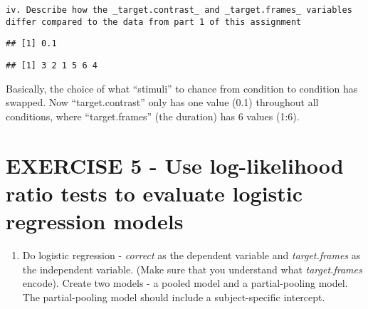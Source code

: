 \documentclass[
]{article}
\newenvironment{Shaded}{\begin{snugshade}}{\end{snugshade}}
\newcommand{\FunctionTok}[1]{\textcolor[rgb]{0.00,0.00,0.00}{#1}}
\newcommand{\NormalTok}[1]{#1}
\newcommand{\SpecialCharTok}[1]{\textcolor[rgb]{0.00,0.00,0.00}{#1}}
\providecommand{\tightlist}{%
  \setlength{\itemsep}{0pt}\setlength{\parskip}{0pt}}
\begin{document}
\begin{verbatim}
iv. Describe how the _target.contrast_ and _target.frames_ variables differ compared to the data from part 1 of this assignment
\end{verbatim}

\begin{Shaded}
\end{Shaded}

\begin{verbatim}
## [1] 0.1
\end{verbatim}

\begin{Shaded}
\end{Shaded}

\begin{verbatim}
## [1] 3 2 1 5 6 4
\end{verbatim}

Basically, the choice of what ``stimuli'' to chance from condition to
condition has swapped. Now ``target.contrast'' only has one value (0.1)
throughout all conditions, where ``target.frames'' (the duration) has 6
values (1:6).

\hypertarget{exercise-5---use-log-likelihood-ratio-tests-to-evaluate-logistic-regression-models}{%
\section{EXERCISE 5 - Use log-likelihood ratio tests to evaluate
logistic regression
models}\label{exercise-5---use-log-likelihood-ratio-tests-to-evaluate-logistic-regression-models}}

\begin{enumerate}
\def\labelenumi{\arabic{enumi})}
\tightlist
\item
  Do logistic regression - \emph{correct} as the dependent variable and
  \emph{target.frames} as the independent variable. (Make sure that you
  understand what \emph{target.frames} encode). Create two models - a
  pooled model and a partial-pooling model. The partial-pooling model
  should include a subject-specific intercept.
\end{enumerate}
\end{document}
